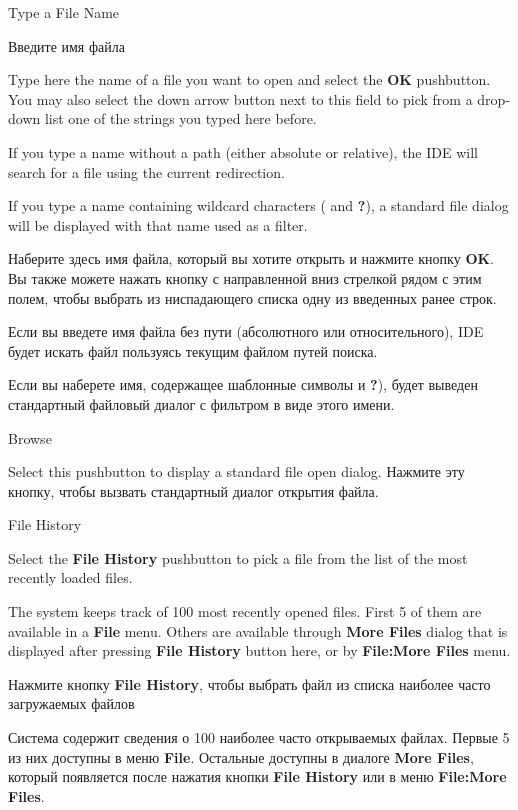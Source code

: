 
\begin{popup}

\ifenglish
\caption{Type a File Name}
 \else
\caption{Введите имя файла}
\fi
{}

\ifenglish
Type here the name of a file you want to open and select
the {\bf OK} pushbutton. You may also select the down arrow button
next to this field to pick from a drop-down list one of the strings
you typed here before.

If you type a name without a path (either absolute or relative),
the IDE will search for a file using the current redirection.

If you type a name containing wildcard characters ({\bf *} and
{\bf ?}), a standard file dialog will be displayed with that name
used as a filter.

 \else
Наберите здесь имя файла, который вы хотите открыть и нажмите кнопку {\bf OK}.
Вы также можете нажать кнопку с направленной вниз стрелкой рядом с этим
полем, чтобы выбрать из ниспадающего списка одну из введенных ранее строк.

Если вы введете имя файла без пути (абсолютного или относительного),
IDE будет искать файл пользуясь текущим файлом путей поиска.

Если вы наберете имя, содержащее шаблонные символы {\bf *} и
{\bf ?}), будет выведен стандартный файловый диалог с фильтром в виде 
этого имени.
\fi
\end{popup}

\begin{popup}
\caption{Browse}

\ifenglish
Select this pushbutton to display a standard file open
dialog.
 \else
Нажмите эту кнопку, чтобы вызвать стандартный диалог открытия файла.
\fi
\end{popup}

\begin{popup}
\caption{File History}

\ifenglish
Select the {\bf File History} pushbutton to pick a file from
the list of the most recently loaded files.

The system keeps track of 100 most recently opened files.
First 5 of them are available in a {\bf File} menu.
Others are available through {\bf More Files} dialog
that is displayed after pressing {\bf File History} button here, or by
{\bf File:More Files} menu.

 \else
Нажмите кнопку  {\bf File History}, чтобы выбрать файл из списка 
наиболее часто загружаемых файлов

Система содержит сведения о 100 наиболее часто открываемых файлах.
Первые 5 из них доступны в меню {\bf File}.
Остальные доступны в диалоге {\bf More Files},
который появляется после нажатия кнопки {\bf File History} или в меню
{\bf File:More Files}.
\fi

\end{popup}

